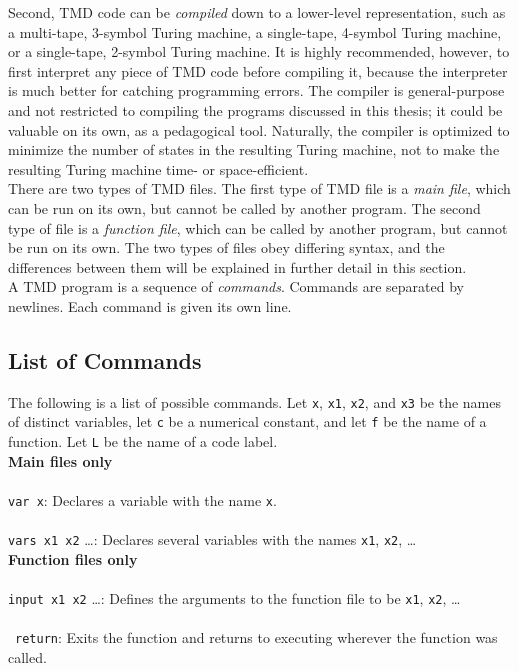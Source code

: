 Second, TMD code can be \emph{compiled} down to a lower-level representation, such as a multi-tape, 3-symbol Turing machine, a single-tape, 4-symbol Turing machine, or a single-tape, 2-symbol Turing machine. It is highly recommended, however, to first interpret any piece of TMD code before compiling it, because the interpreter is much better for catching programming errors. The compiler is general-purpose and not restricted to compiling the programs discussed in this thesis; it could be valuable on its own, as a pedagogical tool. Naturally, the compiler is optimized to minimize the number of states in the resulting Turing machine, not to make the resulting Turing machine time- or space-efficient. \\

There are two types of TMD files. The first type of TMD file is a \emph{main file}, which can be run on its own, but cannot be called by another program. The second type of file is a \emph{function file}, which can be called by another program, but cannot be run on its own. The two types of files obey differing syntax, and the differences between them will be explained in further detail in this section. \\

A TMD program is a sequence of \emph{commands}. Commands are separated by newlines. Each command is given its own line. \\

\subsection{List of Commands}

The following is a list of possible commands. Let \texttt{x}, \texttt{x1}, \texttt{x2}, and \texttt{x3} be the names of distinct variables, let \texttt{c} be a numerical constant, and let \texttt{f} be the name of a function. Let \texttt{L} be the name of a code label. \\

\textbf{Main files only} \\ \\
\texttt{var x}: Declares a variable with the name \texttt{x}. \\ \\
\texttt{vars x1 x2} \dots: Declares several variables with the names \texttt{x1}, \texttt{x2}, \dots \\

\textbf{Function files only} \\ \\
\texttt{input x1 x2} \dots: Defines the arguments to the function file to be \texttt{x1}, \texttt{x2}, \dots \\ \\\
\texttt{return}: Exits the function and returns to executing wherever the function was called. \\

